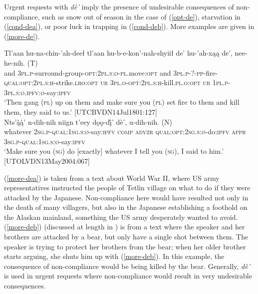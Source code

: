 \documentclass[output=paper,colorlinks,citecolor=brown
]{langscibook}
\begin{document}
Urgent requests with \textit{dè'} imply the presence of undesirable consequences of non-compliance, such as snow out of season in the case of (\ref{opt-de}), starvation in (\ref{cond-dea}), or poor luck in trapping in (\ref{cond-deb}). More examples are given in (\ref{more-de}). 

\begin{exe}
\ex \label{more-de}
\begin{xlista}
\ex\label{more-dea}
\gll Tl'aan hu-na-chin-'ah-deeł tl'aan hu-b-e-kon'-nah-shyiił de' hu-'ah-xąą de', {nee-he-nih. \textnormal{(T)}} \\
and \textsc{3pl.p}-surround-group-\textsc{opt:2pl.s:ø-pl}.move:\textsc{opt} and \textsc{3pl.p-?-pp}-fire-\textsc{qual:opt:2pl.s:h}-strike.\textsc{lro:opt} \textsc{ur} \textsc{3pl.o-opt:2pl.s:h}-kill.\textsc{pl.o:opt} \textsc{ur} \textsc{1pl.p-3pl.s:ø.ipfv:ø}-say:\textsc{ipfv}\\
\glt `Then gang (\textsc{pl}) up on them and make sure you (\textsc{pl}) set fire to them and kill them, they said to us.' \hfill [UTCBVDN14Jul1801:127] \\
\ex\label{more-deb}
\gll Nts'ą̀ą̀' n-dih-nih niign t'eey dǫǫ-dį̀' dè', {u-dih-nih. \textnormal{(N)}}\\
whatever \textsc{2sg.p-qual:1sg.s:ø}-say:\textsc{ipfv} \textsc{comp} \textsc{advzr} \textsc{qual:opt:2sg.s:ø}-do:\textsc{ipfv} \textsc{appr} \textsc{3sg.p-qual:1sg.s:ø}-say:\textsc{ipfv} \\
\glt `Make sure you (\textsc{sg}) do [exactly] whatever I tell you (\textsc{sg}), I said to him.' \hfill [UTOLVDN13May2004:067]
\end{xlista}
\end{exe}

\noindent (\ref{more-dea}) is taken from a text about World War II, where US army representatives instructed the people of Tetlin village on what to do if they were attacked by the Japanese. Non-compliance here would have resulted not only in the death of many villagers, but also in the Japanese establishing a foothold on the Alaskan mainland, something the US army desperately wanted to avoid. (\ref{more-deb}) (discussed at length in \citealt{LovickO2016}) is from a text where the speaker and her brothers are attacked by a bear, but only have a single shot between them. The speaker is trying to protect her brothers from the bear; when her older brother starts arguing, she shuts him up with (\ref{more-deb}). In this example, the consequence of non-compliance would be being killed by the bear. Generally, \textit{dè'} is used in urgent requests where non-compliance would result in very undesirable consequences.
\end{document}
